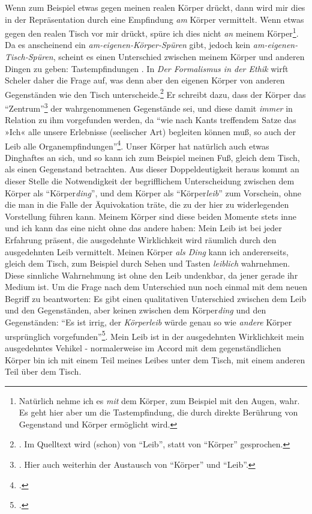 \documentclass[a4paper, 12pt]{article}
\begin{document}
\begin{onehalfspace}
Wenn zum Beispiel etwas gegen meinen realen Körper drückt, dann wird mir dies in der Repräsentation durch eine Empfindung \emph{am} Körper vermittelt. Wenn etwas gegen den realen Tisch vor mir drückt, spüre ich dies nicht \emph{an} meinem Körper\footnote{Natürlich nehme ich es \emph{mit} dem Körper, zum Beispiel mit den Augen, wahr. Es geht hier aber um die Tastempfindung, die durch direkte Berührung von Gegenstand und Körper ermöglicht wird.}. Da es anscheinend ein \emph{am-eigenen-Körper-Spüren} gibt, jedoch kein \emph{am-eigenen-Tisch-Spüren}, scheint es einen Unterschied zwischen meinem Körper und anderen Dingen zu geben: Tastempfindungen . In \emph{Der Formalismus in der Ethik} wirft Scheler daher die Frage auf, was denn aber den eigenen Körper von anderen Gegenständen wie den Tisch unterscheide.\footnote{\Cite[Vgl.][S. 498]{scheler-ethik}. Im Quelltext wird (schon) von "`Leib"', statt von "`Körper"' gesprochen.} Er schreibt dazu, dass der Körper das "`Zentrum"'\footnote{\Cite[Vgl.][S. 498]{scheler-ethik}. Hier auch weiterhin der Austausch von "`Körper"' und "`Leib"'.} der wahrgenommenen Gegenstände sei, und diese damit \emph{immer} in Relation zu ihm vorgefunden werden, da "`wie nach Kants treffendem Satze das »Ich« alle unsere Erlebnisse (seelischer Art) begleiten können muß, so auch der Leib alle Organempfindungen"'\footnote{\Cite[Siehe][S. 495]{scheler-ethik}.}. Unser Körper hat natürlich auch etwas Dinghaftes an sich, und so kann ich zum Beispiel meinen Fuß, gleich dem Tisch, als einen Gegenstand betrachten. Aus dieser Doppeldeutigkeit heraus kommt an dieser Stelle die Notwendigkeit der begrifflichem Unterscheidung zwischen dem Körper als "`Körper\emph{ding}"', und dem Körper als "`Körper\emph{leib}"' zum Vorschein, ohne die man in die Falle der Äquivokation träte, die zu der hier zu widerlegenden Vorstellung führen kann. Meinem Körper sind diese beiden Momente stets inne und ich kann das eine nicht ohne das andere haben: Mein Leib ist bei jeder Erfahrung präsent, die ausgedehnte Wirklichkeit wird räumlich durch den ausgedehnten Leib vermittelt. Meinen Körper \emph{als Ding} kann ich andererseits, gleich dem Tisch, zum Beispiel durch Sehen und Tasten \emph{leiblich} wahrnehmen. Diese sinnliche Wahrnehmung ist ohne den Leib undenkbar, da jener gerade ihr Medium ist. Um die Frage nach dem Unterschied nun noch einmal mit dem neuen Begriff zu beantworten: Es gibt einen qualitativen Unterschied zwischen dem Leib und den Gegenständen, aber keinen zwischen dem Körper\emph{ding} und den Gegenständen: "`Es ist irrig, der \emph{Körperleib} würde genau so wie \emph{andere} Körper ursprünglich vorgefunden"'\footnote{\Cite[Siehe][S. 494]{scheler-ethik}.}. Mein Leib ist in der ausgedehnten Wirklichkeit mein ausgedehntes Vehikel - normalerweise im Accord mit dem gegenständlichen Körper bin ich mit einem Teil meines Leibes unter dem Tisch, mit einem anderen Teil über dem Tisch. 


\end{onehalfspace}
\end{document}
